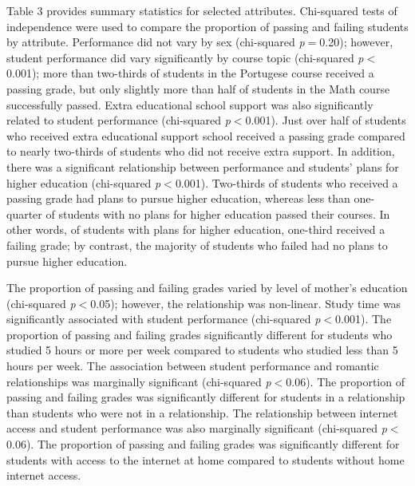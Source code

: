 \documentclass[sigconf]{acmart}
\begin{document}

Table 3 provides summary statistics for selected attributes. Chi-squared tests 
of independence were used to compare the proportion of passing and failing 
students by attribute. Performance did not vary by sex (chi-squared 
\textit{p}$=$0.20); however, student performance did vary significantly by 
course topic (chi-squared \textit{p}$<$0.001); more than two-thirds of students 
in the Portugese course received a passing grade, but only slightly more than 
half of students in the Math course successfully passed. Extra educational 
school support was also significantly related to student performance 
(chi-squared \textit{p}$<$0.001). Just over half of students who received 
extra educational support school received a passing grade compared to nearly 
two-thirds of students who did not receive extra support. In addition, there 
was a significant relationship between performance and students' plans for 
higher education (chi-squared \textit{p}$<$0.001). Two-thirds of students 
who received a passing grade had plans to pursue higher education, whereas 
less than one-quarter of students with no plans for higher education passed 
their courses. In other words, of students with plans for higher education, 
one-third received a failing grade; by contrast, the majority of students who 
failed had no plans to pursue higher education. 


The proportion of passing and failing grades varied by level of mother's 
education (chi-squared \textit{p}$<$0.05); however, the relationship was 
non-linear. Study time was significantly associated with student performance 
(chi-squared \textit{p}$<$0.001). The proportion of passing and failing 
grades significantly different for students who studied 5 hours or more 
per week compared to students who studied less than 5 hours per week. 
The association between student performance and romantic relationships
was marginally significant (chi-squared \textit{p}$<$0.06). The proportion 
of passing and failing grades was significantly different for students in 
a relationship than students who were not in a relationship. The relationship 
between internet access and student performance was also marginally significant 
(chi-squared \textit{p}$<$0.06). The proportion of passing and failing grades 
was significantly different for students with access to the internet at home
compared to students without home internet access.
\end{document}
